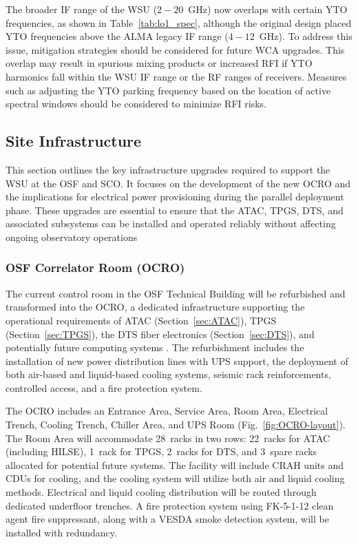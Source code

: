 The broader \ac{IF} range of the \ac{WSU} ($2-20$~GHz) now overlaps with certain YTO frequencies, as shown in Table~\ref{tab:lo1_spec}, although the original design placed \ac{YTO} frequencies above the \ac{ALMA} legacy \ac{IF} range ($4-12$~GHz).
To address this issue, mitigation strategies should be considered for future \ac{WCA} upgrades.
This overlap may result in spurious mixing products or increased \ac{RFI} if \ac{YTO} harmonics fall within the \ac{WSU} \ac{IF} range or the \ac{RF} ranges of receivers.
Measures such as adjusting the \ac{YTO} parking frequency based on the location of active spectral windows should be considered to minimize \ac{RFI} risks.


\subsection{Site Infrastructure}

This section outlines the key infrastructure upgrades required to support the \ac{WSU} at the \ac{OSF} and \ac{SCO}. 
It focuses on the development of the new \ac{OCRO} and the implications for electrical power provisioning during the parallel deployment phase.
These upgrades are essential to ensure that the \ac{ATAC}, \ac{TPGS}, \ac{DTS}, and associated subsystems can be installed and operated reliably without affecting ongoing observatory operations


\subsubsection{OSF Correlator Room (OCRO)}
\label{sec:OCRO}

The current control room in the \ac{OSF} Technical Building will be refurbished and transformed into the \ac{OCRO}, a dedicated infrastructure supporting the operational requirements of \ac{ATAC} (Section~\ref{sec:ATAC}), \ac{TPGS} (Section~\ref{sec:TPGS}), the \ac{DTS} fiber electronics (Section~\ref{sec:DTS}), and potentially future computing systems  \cite{OCRO_DSN}.
The refurbishment includes the installation of new power distribution lines with \ac{UPS} support, the deployment of both air-based and liquid-based cooling systems, seismic rack reinforcements, controlled access, and a fire protection system.

The \ac{OCRO} includes an Entrance Area, Service Area, Room Area, Electrical Trench, Cooling Trench, Chiller Area, and UPS Room (Fig.~\ref{fig:OCRO-layout}).
The Room Area will accommodate 28~racks in two rows: 22~racks for \ac{ATAC} (including \ac{HILSE}), 1~rack for \ac{TPGS}, 2~racks for \ac{DTS}, and 3~spare racks allocated for potential future systems.
The facility will include \ac{CRAH} units and \acp{CDU} for cooling, and the cooling system will utilize both air and liquid cooling methods. Electrical and liquid cooling distribution will be routed through dedicated underfloor trenches.
A fire protection system using FK-5-1-12 clean agent fire suppressant, along with a \ac{VESDA} smoke detection system, will be installed with redundancy.


